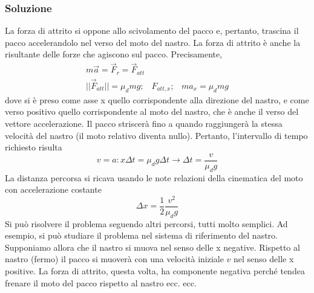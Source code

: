 \documentclass{book}
\begin{document}
\subsubsection{Soluzione}
La forza di attrito si oppone allo scivolamento del pacco e, pertanto, trascina il pacco accelerandolo nel verso del moto del nastro. La forza di attrito è anche la risultante delle forze che agiscono sul pacco. Precisamente,
\begin{eqnarray*}
	m\overrightarrow{a}=\overrightarrow{F}_r=\overrightarrow{F}_{att}\\
	||\overrightarrow{F}_{att}||=\mu_dmg;&F_{att,x};&ma_x=\mu_dmg
\end{eqnarray*}
dove si è  preso come asse x quello corrispondente alla direzione del nastro, e come verso positivo quello corrispondente al moto del nastro, che è anche il verso del vettore accelerazione. Il pacco striscerà fino a quando raggiungerà la stessa velocità del nastro (il moto relativo diventa nullo). Pertanto, l’intervallo di tempo richiesto risulta
\begin{equation*}
	v=a:x\Delta t=\mu_dg\Delta t\to \Delta t=\frac{v}{\mu_dg}
\end{equation*}
La distanza percorsa si ricava usando le note relazioni della cinematica del moto con accelerazione costante
\begin{equation*}
	\Delta x=\frac{1}{2}\frac{v^2}{\mu_dg}
\end{equation*}
Si può risolvere il problema seguendo altri percorsi, tutti molto semplici. Ad esempio, si può studiare il problema nel sistema di riferimento del nastro. Supponiamo allora che il nastro si muova nel senso delle x negative. Rispetto al nastro (fermo) il pacco si muoverà con una velocità iniziale $v$ nel senso delle x positive. La forza di attrito, questa volta, ha componente negativa perché tendea frenare il moto del pacco rispetto al nastro ecc. ecc.
\end{document}
